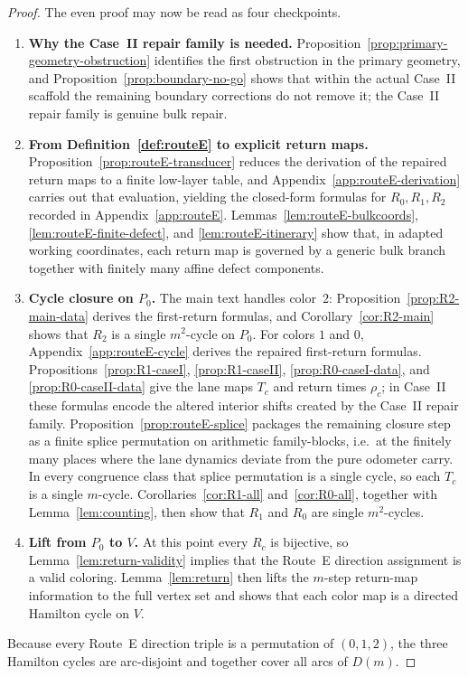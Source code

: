 \documentclass[11pt]{article}
\begin{document}
\begin{proof}
The even proof may now be read as four checkpoints.
\begin{enumerate}[label=\textup{(\roman*)},leftmargin=2.5em]
\item \textbf{Why the Case~II repair family is needed.}
Proposition~\ref{prop:primary-geometry-obstruction} identifies the first obstruction in the primary geometry, and Proposition~\ref{prop:boundary-no-go} shows that within the actual Case~II scaffold the remaining boundary corrections do not remove it; the Case~II repair family is genuine bulk repair.

\item \textbf{From Definition~\ref{def:routeE} to explicit return maps.}
Proposition~\ref{prop:routeE-transducer} reduces the derivation of the repaired return maps to a finite low-layer table, and Appendix~\ref{app:routeE-derivation} carries out that evaluation, yielding the closed-form formulas for $R_0,R_1,R_2$ recorded in Appendix~\ref{app:routeE}.
Lemmas~\ref{lem:routeE-bulkcoords}, \ref{lem:routeE-finite-defect}, and \ref{lem:routeE-itinerary} show that, in adapted working coordinates, each return map is governed by a generic bulk branch together with finitely many affine defect components.

\item \textbf{Cycle closure on $P_0$.}
The main text handles color~$2$: Proposition~\ref{prop:R2-main-data} derives the first-return formulas, and Corollary~\ref{cor:R2-main} shows that $R_2$ is a single $m^2$-cycle on $P_0$.
For colors $1$ and $0$, Appendix~\ref{app:routeE-cycle} derives the repaired first-return formulas.
Propositions~\ref{prop:R1-caseI}, \ref{prop:R1-caseII}, \ref{prop:R0-caseI-data}, and \ref{prop:R0-caseII-data} give the lane maps $T_c$ and return times $\rho_c$; in Case~II these formulas encode the altered interior shifts created by the Case~II repair family.
Proposition~\ref{prop:routeE-splice} packages the remaining closure step as a finite splice permutation on arithmetic family-blocks, i.e.\ at the finitely many places where the lane dynamics deviate from the pure odometer carry.
In every congruence class that splice permutation is a single cycle, so each $T_c$ is a single $m$-cycle.
Corollaries~\ref{cor:R1-all} and~\ref{cor:R0-all}, together with Lemma~\ref{lem:counting}, then show that $R_1$ and $R_0$ are single $m^2$-cycles.

\item \textbf{Lift from $P_0$ to $V$.}
At this point every $R_c$ is bijective, so Lemma~\ref{lem:return-validity} implies that the Route~E direction assignment is a valid coloring.
Lemma~\ref{lem:return} then lifts the $m$-step return-map information to the full vertex set and shows that each color map is a directed Hamilton cycle on $V$.
\end{enumerate}
Because every Route~E direction triple is a permutation of $(0,1,2)$, the three Hamilton cycles are arc-disjoint and together cover all arcs of $D(m)$.
\end{proof}
\end{document}
